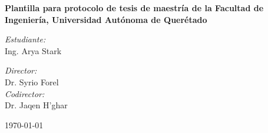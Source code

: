 
\begin{titlepage}

\vspace*{10cm}
{\huge \bfseries \textcolor{RojoUAQ}{Plantilla para protocolo de tesis de maestría de la Facultad de Ingeniería, Universidad Autónoma de Querétado}\\[1cm] }

\begin{center}
	\noindent
	\begin{minipage}{0.4\textwidth}
	\begin{flushleft} \large
	\emph{Estudiante:}\\
	Ing. Arya Stark
	\end{flushleft}
	\end{minipage}	
	\begin{minipage}{0.4\textwidth}
	\begin{flushright} \large
	\emph{Director:} \\
	Dr. Syrio Forel \\[1.5cm]
	\emph{Codirector:} \\
	Dr. Jaqen H'ghar
	\end{flushright}
	\end{minipage}
    
	\vfill
    
	{\large \today}
\end{center}
\end{titlepage}
